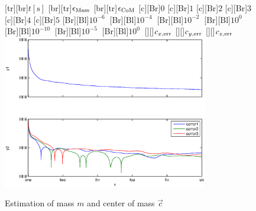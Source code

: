 \begin{figure}
	\centering	
	[tr][br]{$t\left[\mathrm{s}\right]$}
	[br][tr]{$\epsilon_{\mathrm{Mass}}$}
	[br][tr]{$\epsilon_{\mathrm{CoM}}$}
	[Br]{$0$}
	[Br]{$1$}
	[Br]{$2$}
	[Br]{$3$}
	[Br]{$4$}
	[Br]{$5$}
	[Br][Bl]{$10^{-6}\  $}
	[Br][Bl]{$10^{-4}\  $}
	[Br][Bl]{$10^{-2}\  $}
	[Br][Bl]{$10^0\  $}
	[Br][Bl]{$10^{-10}\  $}
	[Br][Bl]{$10^{-5}\  $}
	[Br][Bl]{$10^0\  $}
	[][]{\tiny $c_{x,\mathrm{err}}$}
	[][]{\tiny $c_{y,\mathrm{err}}$}
	[][]{\tiny $c_{z,\mathrm{err}}$}
	\includegraphics[width=0.8\textwidth]{figures/mass.eps}
	\vspace{0.2cm}
	\caption{Estimation of mass $m$ and center of mass $\vec{c}$}
	\label{fig:estim_mass}
\end{figure}

